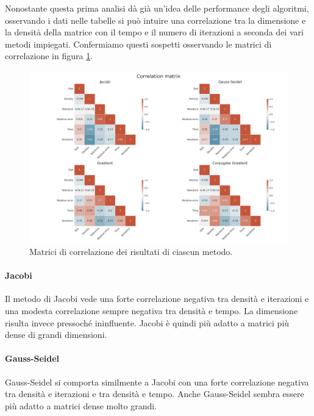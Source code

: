 \documentclass[12pt]{article}
\begin{document}
Nonostante questa prima analisi dà già un'idea delle performance degli algoritmi, osservando i dati nelle tabelle si può intuire una correlazione tra la dimensione e la densità della matrice con il tempo e il numero di iterazioni a seconda dei vari metodi impiegati. 
Confermiamo questi sospetti osservando le matrici di correlazione in figura \ref{fig:cormat}.

\begin{figure}[!ht]
    \begin{center}
    \hspace*{-2cm}   
    \includegraphics[scale=0.25]{images/heatmaps.png}
    \caption{Matrici di correlazione dei risultati di ciascun metodo.}
    \label{fig:cormat}
    \end{center}
\end{figure}

\paragraph{Jacobi}
Il metodo di Jacobi vede una forte correlazione negativa tra densità e iterazioni e una modesta correlazione sempre negativa tra densità e tempo. La dimensione risulta invece pressoché ininfluente. Jacobi è quindi più adatto a matrici più dense di grandi dimensioni.

\paragraph{Gauss-Seidel}
Gauss-Seidel si comporta similmente a Jacobi con una forte correlazione negativa tra densità e iterazioni e tra densità e tempo. Anche Gauss-Seidel sembra essere più adatto a matrici dense molto grandi.
\end{document}
